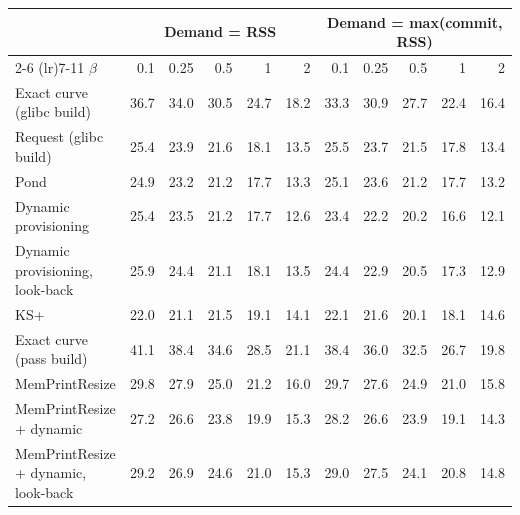 \begin{tabular}{lrrrrrrrrrr}
\toprule
 & \multicolumn{5}{c}{Demand = RSS} & \multicolumn{5}{c}{Demand = max(commit, RSS)} \\
\cmidrule(lr){2-6} \cmidrule(lr){7-11}
$\beta$ & 0.1 & 0.25 & 0.5 & 1 & 2 & 0.1 & 0.25 & 0.5 & 1 & 2 \\
\midrule
Exact curve (glibc build) & 36.7 & 34.0 & 30.5 & 24.7 & 18.2 & 33.3 & 30.9 & 27.7 & 22.4 & 16.4 \\
Request (glibc build) & 25.4 & 23.9 & 21.6 & 18.1 & 13.5 & 25.5 & 23.7 & 21.5 & 17.8 & 13.4 \\
Pond & 24.9 & 23.2 & 21.2 & 17.7 & 13.3 & 25.1 & 23.6 & 21.2 & 17.7 & 13.2 \\
Dynamic provisioning & 25.4 & 23.5 & 21.2 & 17.7 & 12.6 & 23.4 & 22.2 & 20.2 & 16.6 & 12.1 \\
Dynamic provisioning, look-back & 25.9 & 24.4 & 21.1 & 18.1 & 13.5 & 24.4 & 22.9 & 20.5 & 17.3 & 12.9 \\
KS+ & 22.0 & 21.1 & 21.5 & 19.1 & 14.1 & 22.1 & 21.6 & 20.1 & 18.1 & 14.6 \\
Exact curve (pass build) & 41.1 & 38.4 & 34.6 & 28.5 & 21.1 & 38.4 & 36.0 & 32.5 & 26.7 & 19.8 \\
MemPrintResize & 29.8 & 27.9 & 25.0 & 21.2 & 16.0 & 29.7 & 27.6 & 24.9 & 21.0 & 15.8 \\
MemPrintResize + dynamic & 27.2 & 26.6 & 23.8 & 19.9 & 15.3 & 28.2 & 26.6 & 23.9 & 19.1 & 14.3 \\
MemPrintResize + dynamic, look-back & 29.2 & 26.9 & 24.6 & 21.0 & 15.3 & 29.0 & 27.5 & 24.1 & 20.8 & 14.8 \\
\bottomrule
\end{tabular}
